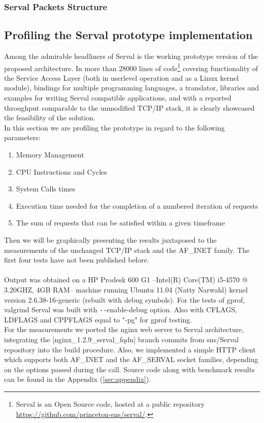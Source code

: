 \subsubsection{Serval Packets Structure}



\subsection{Profiling the Serval prototype implementation}
Among the admirable headliners of Serval is the working prototype version of the proposed architecture.
In more than 28000 lines of code\footnote{Serval is an Open Source code, hosted at a public repository\\ \url{https://github.com/princeton-sns/serval/}.} covering functionality of the Service Access Layer (both in userlevel operation and as a Linux kernel module), bindings for multiple programming languages, a translator, libraries and examples for writing Serval compatible applications, and with a reported throughput comparable to the unmodified TCP/IP stack, it is clearly showcased the feasibility of the solution.\\
\indent In this section we are profiling the prototype in regard to the following parameters:
\begin{enumerate}
  \item Memory Management
  \item CPU Instructions and Cycles
  \item System Calls times
  \item Execution time needed for the completion of a numbered iteration of requests
  \item The sum of requests that can be satisfied within a given timeframe
\end{enumerate}
Then we will be graphically presenting the results juxtaposed to the measurements of the unchanged TCP/IP stack and the AF\_INET family. The first four tests have not been published before.

\paragraph{} Output was obtained on a HP Prodesk 600 G1 --Intel(R) Core(TM) i5-4570 @ 3.20GHZ, 4GB RAM-- machine running Ubuntu 11.04 (Natty Narwahl) kernel version 2.6.38-16-generic (rebuilt with debug symbols).
For the tests of gprof, valgrind Serval was built with \texttt{-{}-}enable-debug option.
Also with CFLAGS, LDFLAGS and CPPFLAGS equal to "-pg" for gprof testing.\\
\indent For the measurements we ported the nginx web server to Serval architecture, integrating the [nginx\_1.2.9\_serval\_fqdn] branch commits from \mbox{sns/Serval} repository into the build procedure.
Also, we implemented a simple HTTP client which supports both AF\_INET and the AF\_SERVAL socket families, depending on the options passed during the call.
Source code along with benchmark results can be found in the Appendix (\ref{sec:appendix}).

\iffalse
gprof
perf
google-profile tools
1) memory (oprofile)
2) CPU cycles (callgrind)
3) system calls time (strace)
4) timed execution of 1000 times
5) requests per second
6) Number of packers per request, bytes sent, packet structure
\fi